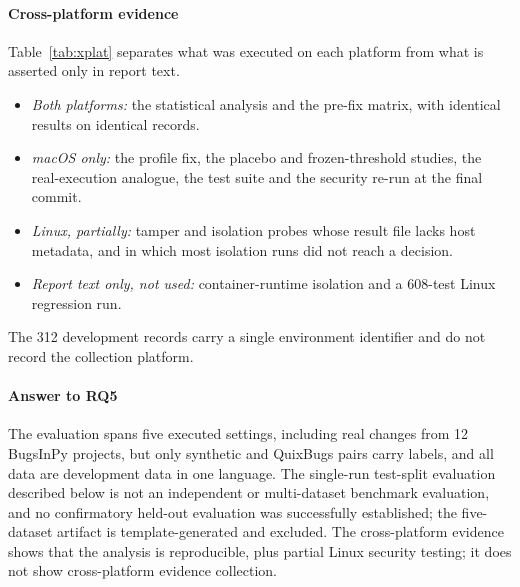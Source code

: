 \paragraph*{Cross-platform evidence} Table~\ref{tab:xplat} separates what was executed on each platform from what is asserted only in report text.
\begin{itemize}
\item \emph{Both platforms:} the statistical analysis and the pre-fix \ers{} matrix, with identical results on identical records.
\item \emph{macOS only:} the profile fix, the placebo and frozen-threshold studies, the real-execution \ers{} analogue, the test suite and the security re-run at the final commit.
\item \emph{Linux, partially:} tamper and isolation probes whose result file lacks host metadata, and in which most isolation runs did not reach a decision.
\item \emph{Report text only, not used:} container-runtime isolation and a 608-test Linux regression run.
\end{itemize}
The 312 development records carry a single environment identifier and do not record the collection platform.

\paragraph*{Answer to RQ5} The evaluation spans five executed settings, including real changes from 12 BugsInPy projects, but only synthetic and QuixBugs pairs carry labels, and all data are development data in one language. The single-run test-split evaluation described below is not an independent or multi-dataset benchmark evaluation, and no confirmatory held-out evaluation was successfully established; the five-dataset artifact is template-generated and excluded. The cross-platform evidence shows that the analysis is reproducible, plus partial Linux security testing; it does not show cross-platform evidence collection.

